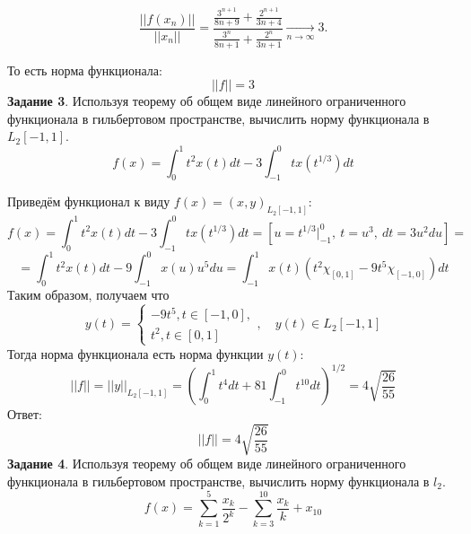 \documentclass[fleqn]{article}
\begin{document}
\begin{equation*} 
	\frac{||f(x_n)||}{||x_n||} = \frac{\frac{3^{n+1}}{8n + 9} + \frac{2^{n+1}}{3n + 4}}{\frac{3^n}{8n + 1} + \frac{2^n}{3n + 1}} \xrightarrow[n \to \infty]{}3.
\end{equation*}

То есть норма функционала:
\begin{equation*} 
	||f|| = 3
\end{equation*}
\textbf {Задание 3}. Используя теорему об общем виде линейного 
ограниченного функционала в гильбертовом
пространстве, вычислить норму функционала в $ L_2[-1, 1]$.
\begin{equation*} 
	f(x) = \int_0^1 t^2 x(t)dt - 3\int_{-1}^0 t x(t^{1/3})dt
\end{equation*}

Приведём функционал к виду $f(x) = (x, y)_{L_2[-1, 1]}$:
\begin{equation*} 
	f(x) = \int_0^1 t^2 x(t)dt - 3\int_{-1}^0 t x(t^{1/3})dt =
	[ u = t^{1/3}|_{-1}^0, \  t = u^3,\  dt = 3u^2du] = 
\end{equation*}
\begin{equation*} 
 =  \int_0^1 t^2 x(t)dt - 9\int_{-1}^0  x(u)u^5du =
	  \int_{-1}^1 x(t)(t^2\chi_{[0, 1]} - 9t^5\chi_{[-1, 0]})dt
\end{equation*}
Таким образом, получаем что
\begin{equation*} 
	 y(t) = \begin{cases} 
				 - 9t^5, t \in [-1, 0], \\
				t^2, t \in [0, 1]
			\end{cases},\quad y(t) \in L_2[-1, 1]
\end{equation*}
Тогда норма функционала есть норма функции $y(t)$:
\begin{equation*} 
	||f|| = ||y||_{ L_2[-1, 1]} = \left(\int_0^1 t^4 dt + 81\int_{-1}^0 t^{10} dt\right)^{1/2} = 4 \sqrt{\frac{26}{55}}
\end{equation*}
Ответ:
\begin{equation*} 
	||f|| =  4 \sqrt{\frac{26}{55}}
\end{equation*}
\textbf {Задание 4}. Используя теорему об общем виде линейного 
ограниченного функционала в гильбертовом
пространстве, вычислить норму функционала в $ l_2$.
\begin{equation*} 
	f(x) = \sum_{k=1}^5\frac{x_k}{2^k} - \sum_{k=3}^{10}\frac{x_k}{k} + x_{10}
\end{equation*}
\end{document}
